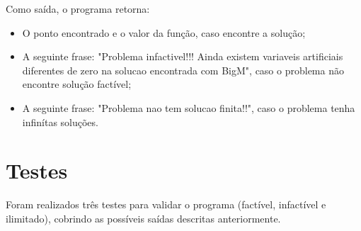 \documentclass[a4paper]{article}
\begin{document}
Como sa\'ida, o programa retorna:

\begin{itemize}
\item O ponto encontrado e o valor da fun\c{c}\~ao, caso encontre a solu\c{c}\~ao;
\item A seguinte frase: "Problema infactivel!!! Ainda existem variaveis artificiais diferentes de zero na solucao encontrada com BigM", caso o problema n\~ao encontre solu\c{c}\~ao fact\'ivel;
\item A seguinte frase: "Problema nao tem solucao finita!!", caso o problema tenha infin\'itas solu\c{c}\~oes.
\end{itemize}

\section{Testes}
Foram realizados tr\^es testes para validar o programa (fact\'ivel, infact\'ivel e ilimitado), cobrindo as poss\'iveis sa\'idas descritas anteriormente.
\end{document}

